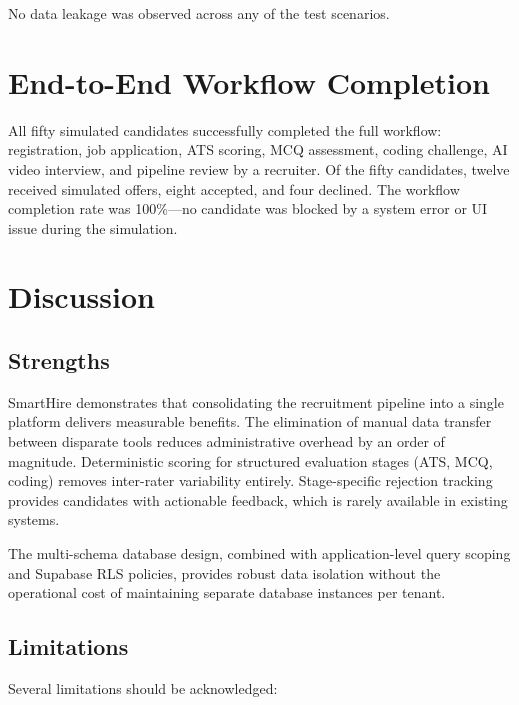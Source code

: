 No data leakage was observed across any of the test scenarios.

\section{End-to-End Workflow Completion}
\label{sec:e2e-results}

All fifty simulated candidates successfully completed the full workflow: registration, job application, ATS scoring, MCQ assessment, coding challenge, AI video interview, and pipeline review by a recruiter. Of the fifty candidates, twelve received simulated offers, eight accepted, and four declined. The workflow completion rate was 100\%---no candidate was blocked by a system error or UI issue during the simulation.

\section{Discussion}
\label{sec:discussion}

\subsection{Strengths}

SmartHire demonstrates that consolidating the recruitment pipeline into a single platform delivers measurable benefits. The elimination of manual data transfer between disparate tools reduces administrative overhead by an order of magnitude. Deterministic scoring for structured evaluation stages (ATS, MCQ, coding) removes inter-rater variability entirely. Stage-specific rejection tracking provides candidates with actionable feedback, which is rarely available in existing systems.

The multi-schema database design, combined with application-level query scoping and Supabase RLS policies, provides robust data isolation without the operational cost of maintaining separate database instances per tenant.

\subsection{Limitations}

Several limitations should be acknowledged:

